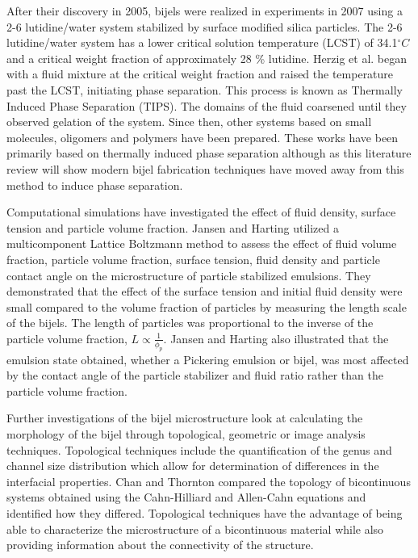 After their discovery in 2005, bijels were realized in experiments in 2007 using a 2-6 lutidine/water system stabilized by surface modified silica particles.
\cite{herzig_bicontinuous_2007} The 2-6 lutidine/water system has a lower critical solution temperature (LCST) of 34.1$^{\circ}C$ and a critical weight fraction of
approximately 28 \% lutidine. \cite{herzig_bicontinuous_2007} Herzig et al. began with a fluid mixture at the critical weight fraction and raised the 
temperature past the LCST, initiating phase separation. \cite{herzig_bicontinuous_2007} This process is known as Thermally Induced Phase Separation (TIPS). 
The domains of the fluid coarsened until they observed
gelation of the system. \cite{herzig_bicontinuous_2007} Since then, other systems based on small molecules, oligomers and polymers have been prepared. 
\cite{tavacoli_novel_2011, lee_bicontinuous_2010, bai_dynamics_2015, ching_rapid_2021} These works have been primarily based on
thermally induced phase separation although as this literature review will show modern bijel fabrication techniques have moved
away from this method to induce phase separation.

Computational simulations have investigated the effect of fluid density, surface tension and particle volume fraction.
\cite{jansen_bijels_2011} Jansen and Harting utilized a multicomponent Lattice Boltzmann method to assess the effect of fluid volume fraction,
particle volume fraction, surface tension, fluid density and particle contact angle on the microstructure of particle stabilized emulsions.
They demonstrated that the effect of the surface tension and initial fluid density were small
compared to the volume fraction of particles by measuring the length scale of the bijels. \cite{jansen_bijels_2011} The length of 
particles was proportional to the inverse of the particle volume fraction, $L \propto \frac{1}{\phi_p}$. \cite{jansen_bijels_2011} 
Jansen and Harting also illustrated that the emulsion state obtained, whether a Pickering emulsion or bijel, was most affected by 
the contact angle of the particle stabilizer and fluid ratio rather than the particle volume fraction. \cite{jansen_bijels_2011}

Further investigations of the bijel microstructure look at calculating the morphology of the bijel through topological, geometric 
or image analysis techniques. Topological techniques include the quantification of the genus and channel size distribution which
allow for determination of differences in the interfacial properties. \cite{chan_channel_2012} Chan and Thornton compared the topology
of bicontinuous systems obtained using the Cahn-Hilliard and Allen-Cahn equations and identified how they differed. \cite{chan_channel_2012}
Topological techniques have the advantage
of being able to characterize the microstructure of a bicontinuous material while also providing information about the connectivity of the
structure. 


